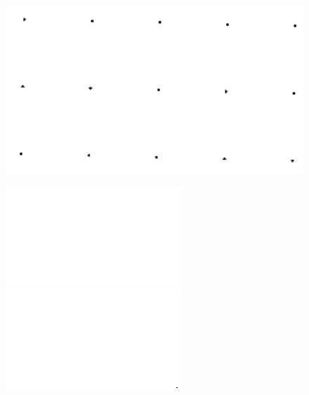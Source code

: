 \begin{figure}[H]
    \centering
\begin{minipage}[h]{0.3\textwidth}
	\vspace*{1cm}
    \includegraphics[width=1\textwidth]{result/hom/im_ref.png}
    \label{fig:hom_ref}
\end{minipage}
\begin{minipage}[t]{0.22\textwidth}
    \includegraphics[width = \textwidth]{result/hom/im_m5.png}
    \label{fig:hom_5}
    \includegraphics[width = \textwidth]{result/hom/im_m20.png}

\end{minipage}
\end{figure}
